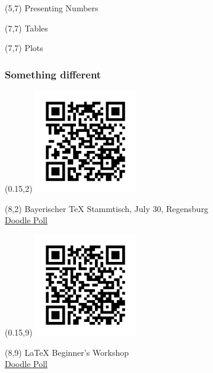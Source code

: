 \documentclass[t]{beamer}
\begin{document}
\begin{frame}
  \begin{textblock}{10}(5,7)
    \LARGE Presenting Numbers
  \end{textblock}
\end{frame}

\begin{frame}
  \begin{textblock}{10}(7,7)
    \LARGE Tables
  \end{textblock}
\end{frame}

\begin{frame}
  \begin{textblock}{10}(7,7)
    \LARGE Plots
  \end{textblock}
\end{frame}

\begin{frame}
  \frametitle{Something different}
  \begin{textblock}{0}(0.15,2)
    \includegraphics[width=4.5cm]{tex-stammtisch}
  \end{textblock}
  \begin{textblock}{6}(8,2)
    Bayerischer \TeX{} Stammtisch, July 30, Regensburg\\
    \href{https://doodle.com/poll/k2dvspqra7pz57hv}{Doodle Poll}
  \end{textblock}

  \begin{textblock}{0}(0.15,9)
    \includegraphics[width=4.5cm]{tex-workshop}
  \end{textblock}
  \begin{textblock}{6}(8,9)
    \LaTeX{} Beginner's Workshop\\
    \href{https://doodle.com/poll/8v3rhrxe2r4zwm4d}{Doodle Poll}
  \end{textblock}
\end{frame}
\end{document}
